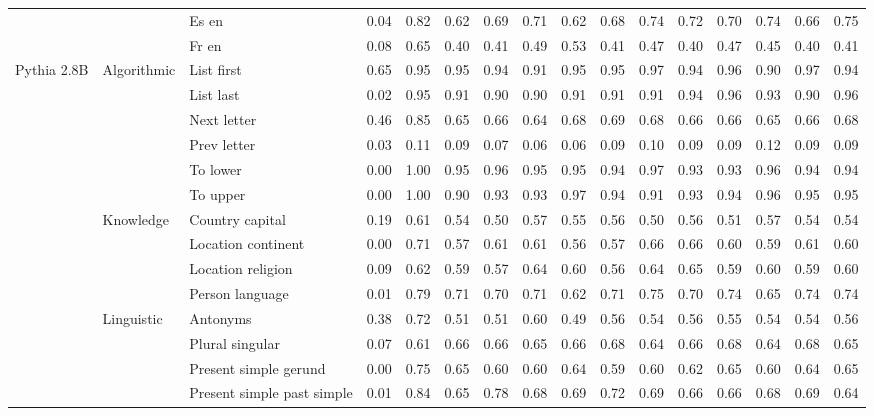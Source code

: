 \begin{center}
\begin{longtable}{lllrrrrrrrrrrrrr}
 &  & Es en & 0.04 & 0.82 & 0.62 & 0.69 & 0.71 & 0.62 & 0.68 & 0.74 & 0.72 & 0.70 & 0.74 & 0.66 & 0.75 \\
 &  & Fr en & 0.08 & 0.65 & 0.40 & 0.41 & 0.49 & 0.53 & 0.41 & 0.47 & 0.40 & 0.47 & 0.45 & 0.40 & 0.41 \\
\cline{1-16} \cline{2-16}
\multirow[t]{18}{*}{Pythia 2.8B} & \multirow[t]{6}{*}{Algorithmic} & List first & 0.65 & 0.95 & 0.95 & 0.94 & 0.91 & 0.95 & 0.95 & 0.97 & 0.94 & 0.96 & 0.90 & 0.97 & 0.94 \\
 &  & List last & 0.02 & 0.95 & 0.91 & 0.90 & 0.90 & 0.91 & 0.91 & 0.91 & 0.94 & 0.96 & 0.93 & 0.90 & 0.96 \\
 &  & Next letter & 0.46 & 0.85 & 0.65 & 0.66 & 0.64 & 0.68 & 0.69 & 0.68 & 0.66 & 0.66 & 0.65 & 0.66 & 0.68 \\
 &  & Prev letter & 0.03 & 0.11 & 0.09 & 0.07 & 0.06 & 0.06 & 0.09 & 0.10 & 0.09 & 0.09 & 0.12 & 0.09 & 0.09 \\
 &  & To lower & 0.00 & 1.00 & 0.95 & 0.96 & 0.95 & 0.95 & 0.94 & 0.97 & 0.93 & 0.93 & 0.96 & 0.94 & 0.94 \\
 &  & To upper & 0.00 & 1.00 & 0.90 & 0.93 & 0.93 & 0.97 & 0.94 & 0.91 & 0.93 & 0.94 & 0.96 & 0.95 & 0.95 \\
\cline{2-16}
 & \multirow[t]{4}{*}{Knowledge} & Country capital & 0.19 & 0.61 & 0.54 & 0.50 & 0.57 & 0.55 & 0.56 & 0.50 & 0.56 & 0.51 & 0.57 & 0.54 & 0.54 \\
 &  & Location continent & 0.00 & 0.71 & 0.57 & 0.61 & 0.61 & 0.56 & 0.57 & 0.66 & 0.66 & 0.60 & 0.59 & 0.61 & 0.60 \\
 &  & Location religion & 0.09 & 0.62 & 0.59 & 0.57 & 0.64 & 0.60 & 0.56 & 0.64 & 0.65 & 0.59 & 0.60 & 0.59 & 0.60 \\
 &  & Person language & 0.01 & 0.79 & 0.71 & 0.70 & 0.71 & 0.62 & 0.71 & 0.75 & 0.70 & 0.74 & 0.65 & 0.74 & 0.74 \\
\cline{2-16}
 & \multirow[t]{4}{*}{Linguistic} & Antonyms & 0.38 & 0.72 & 0.51 & 0.51 & 0.60 & 0.49 & 0.56 & 0.54 & 0.56 & 0.55 & 0.54 & 0.54 & 0.56 \\
 &  & Plural singular & 0.07 & 0.61 & 0.66 & 0.66 & 0.65 & 0.66 & 0.68 & 0.64 & 0.66 & 0.68 & 0.64 & 0.68 & 0.65 \\
 &  & Present simple gerund & 0.00 & 0.75 & 0.65 & 0.60 & 0.60 & 0.64 & 0.59 & 0.60 & 0.62 & 0.65 & 0.60 & 0.64 & 0.65 \\
 &  & Present simple past simple & 0.01 & 0.84 & 0.65 & 0.78 & 0.68 & 0.69 & 0.72 & 0.69 & 0.66 & 0.66 & 0.68 & 0.69 & 0.64 \\

\end{longtable}
\end{center}
